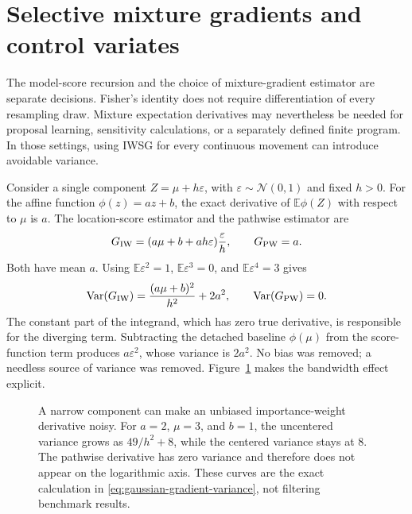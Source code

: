 \documentclass[11pt]{article}
\begin{document}
\section{Selective mixture gradients and control variates}
\label{sec:hybrid}

The model-score recursion and the choice of mixture-gradient estimator are
separate decisions. Fisher's identity does not require differentiation of
every resampling draw. Mixture expectation derivatives may nevertheless be
needed for proposal learning, sensitivity calculations, or a separately
defined finite program. In those settings, using IWSG for every continuous
movement can introduce avoidable variance.

Consider a single component $Z=\mu+h\varepsilon$, with
$\varepsilon\sim\mathcal N(0,1)$ and fixed $h>0$. For the affine function
$\phi(z)=az+b$, the exact derivative of $\mathbb E\phi(Z)$ with respect to
$\mu$ is $a$. The location-score estimator and the pathwise estimator are
\begin{equation}
 G_{\rm IW}=(a\mu+b+ah\varepsilon)\frac{\varepsilon}{h},
 \qquad G_{\rm PW}=a.
 \label{eq:gaussian-gradient-estimators}
\end{equation}
Both have mean $a$. Using
$\mathbb E\varepsilon^2=1$, $\mathbb E\varepsilon^3=0$, and
$\mathbb E\varepsilon^4=3$ gives
\begin{equation}
 \operatorname{Var}(G_{\rm IW})
   =\frac{(a\mu+b)^2}{h^2}+2a^2,
 \qquad \operatorname{Var}(G_{\rm PW})=0.
 \label{eq:gaussian-gradient-variance}
\end{equation}
The constant part of the integrand, which has zero true derivative, is
responsible for the diverging term. Subtracting the detached baseline
$\phi(\mu)$ from the score-function term produces $a\varepsilon^2$, whose
variance is $2a^2$. No bias was removed; a needless source of variance was
removed. Figure~\ref{fig:gradient-variance} makes the bandwidth effect explicit.

\begin{figure}[tbp]
\centering
{}
\caption{A narrow component can make an unbiased importance-weight derivative
noisy. For $a=2$, $\mu=3$, and $b=1$, the uncentered variance grows as
$49/h^2+8$, while the centered variance stays at 8. The pathwise derivative
has zero variance and therefore does not appear on the logarithmic axis.
These curves are the exact calculation in
\eqref{eq:gaussian-gradient-variance}, not filtering benchmark results.}
\label{fig:gradient-variance}
\end{figure}
\end{document}
